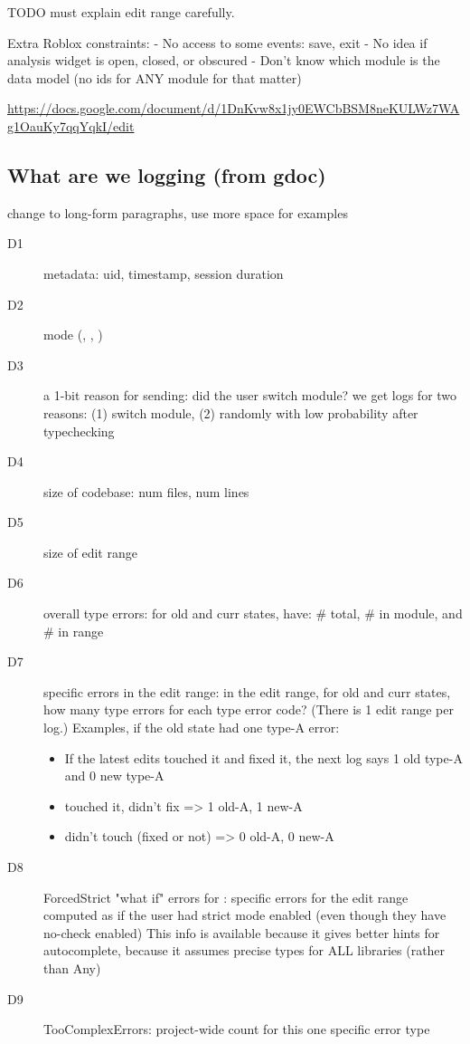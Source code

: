 \documentclass[english,submission,cleveref]{programming}
\begin{document}
TODO must explain edit range carefully.


Extra Roblox constraints:
- No access to some events: save, exit
- No idea if analysis widget is open, closed, or obscured
- Don't know which module is the data model
  (no ids for ANY module for that matter)

\url{https://docs.google.com/document/d/1DnKvw8x1jy0EWCbBSM8neKULWz7WAg1OauKy7qqYqkI/edit}


\subsection{What are we logging (from gdoc)}

\FILL{} change to long-form paragraphs, use more space for examples

\begin{description}
  \item[D1] metadata: uid, timestamp, session duration
  \item[D2] mode (\mnocheck{}, \mnonstrict{}, \mstrict{})
  \item[D3] a 1-bit reason for sending: did the user switch module?
    \subitem we get logs for two reasons: (1) switch module, (2) randomly with
    low probability after typechecking
  \item[D4] size of codebase: num files, num lines
  \item[D5] size of edit range
  \item[D6] overall type errors: for old and curr states, have: \# total, \# in module, and \# in range
  \item[D7] specific errors in the edit range: in the edit range, for old and
    curr states, how many type errors for each type error code? (There is 1
    edit range per log.)
    \subitem Examples, if the old state had one type-A error:
    \begin{itemize}
      \item If the latest edits touched it and fixed it, the next log says 1
        old type-A and 0 new type-A
      \item touched it, didn't fix => 1 old-A, 1 new-A
      \item didn't touch (fixed or not) => 0 old-A, 0 new-A
    \end{itemize}
  \item[D8] ForcedStrict "what if" errors for \mnocheck{}: specific errors for the
    edit range computed as if the user had strict mode enabled (even though they
    have no-check enabled)
    \subitem This info is available because it gives better hints for
    autocomplete, because it assumes precise types for ALL libraries (rather
    than Any)
  \item[D9] TooComplexErrors: project-wide count for this one specific error type
\end{description}
\end{document}

